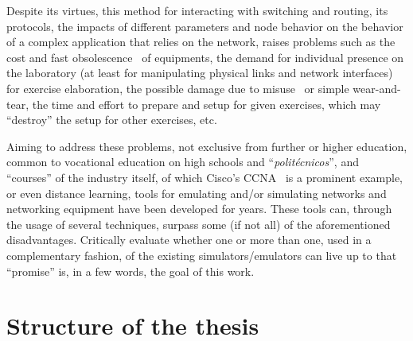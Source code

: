 Despite its virtues, this method for interacting with switching and routing, its protocols, the impacts of different parameters and node behavior on the behavior of a complex application that relies on the network, raises problems such as the cost and fast obsolescence~\cite{automaticnetconfiggns} of equipments, the demand for individual presence on the laboratory (at least for manipulating physical links and network interfaces) for exercise elaboration, the possible damage due to misuse~\cite{teachinginovation} or simple wear-and-tear, the time and effort to prepare and setup for given exercises, which may ``destroy'' the setup for other exercises, etc. %

Aiming to address these problems, not exclusive from further or higher education, common to vocational education on high schools and ``\emph{politécnicos}'', and ``courses'' of the industry itself, of which Cisco's CCNA~\cite{ccna} is a prominent example, or even distance learning, tools for emulating and/or simulating networks and networking equipment have been developed for years. %
These tools can, through the usage of several techniques, surpass some (if not all) of the aforementioned disadvantages.
Critically evaluate whether one or more than one, used in a complementary fashion, of the existing simulators/emulators can live up to that ``promise'' is, in a few words, the goal of this work.



\section{Structure of the thesis}
\label{sec:structure}

